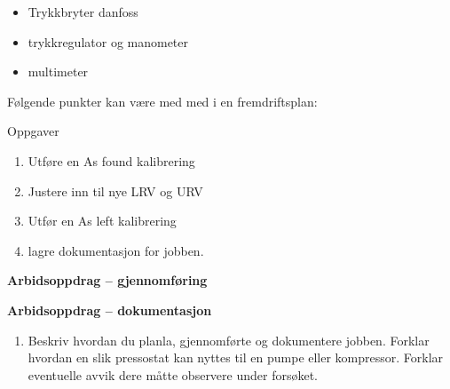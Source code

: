 \vskip 5pt 
\begin{itemize}[noitemsep]
	\item Trykkbryter danfoss
	\item trykkregulator og manometer
	\item multimeter
\end{itemize}

Følgende punkter kan være med med i en fremdriftsplan:

Oppgaver\begin{enumerate}
	\item Utføre en As found kalibrering 
	\item Justere inn til nye LRV og URV
	\item Utfør en As left kalibrering 
	\item lagre dokumentasjon for jobben.
\end{enumerate}
\textbf{Arbidsoppdrag -- gjennomføring}

\textbf{Arbidsoppdrag -- dokumentasjon}

\begin{enumerate}
	\item Beskriv hvordan du planla, gjennomførte og dokumentere jobben. Forklar hvordan en slik pressostat kan nyttes til en pumpe eller kompressor. Forklar eventuelle avvik dere måtte observere under forsøket. 
\end{enumerate}




\noindent

\vfil \eject

















